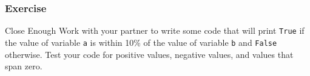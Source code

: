\documentclass{beamer}
\begin{document}
\begin{frame}
  \frametitle{Exercise}
  \begin{block}{Close Enough}
    Work with your partner to write some code that will print \texttt{True}
    if the value of variable \texttt{a} is within 10\% of the value of variable \texttt{b}
    and \texttt{False} otherwise.
    Test your code for positive values, negative values, and values that span zero.
  \end{block}
\end{frame}




\end{document}
